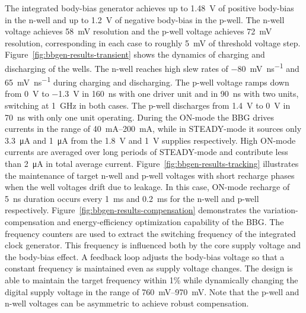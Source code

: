 \documentclass[graybox]{svmult}
\begin{document}
The integrated body-bias generator achieves up to \SI{1.48}{\volt} of positive body-bias in the n-well and up to \SI{1.2}{\volt} of negative body-bias in the p-well.
The n-well voltage achieves \SI{58}{\milli\volt} resolution and the p-well voltage achieves \SI{72}{\milli\volt} resolution, corresponding in each case to roughly \SI{5}{\milli\volt} of threshold voltage step.
Figure~\ref{fig:bbgen-results-transient} shows the dynamics of charging and discharging of the wells.
The n-well reaches high slew rates of \SI{-80}{\milli\volt\per\nano\second} and \SI[retain-explicit-plus]{+65}{\milli\volt\per\nano\second} during charging and discharging.
The p-well voltage ramps down from \SI{0}{\volt} to \SI{-1.3}{\volt} in \SI{160}{\nano\second} with one driver unit and in \SI{90}{\nano\second} with two units, switching at \SI{1}{\giga\hertz} in both cases.
The p-well discharges from \SI{1.4}{\volt} to \SI{0}{\volt} in \SI{70}{\nano\second} with only one unit operating.
During the ON-mode the BBG drives currents in the range of \SIrange[range-phrase = --]{40}{200}{\milli\ampere}, while in STEADY-mode it sources only \SI{3.3}{\micro\ampere} and \SI{1}{\micro\ampere} from the \SI{1.8}{\volt} and \SI{1}{\volt} supplies respectively.
High ON-mode currents are averaged over long periods of STEADY-mode and contribute less than \SI{2}{\micro\ampere} in total average current.
Figure~\ref{fig:bbgen-results-tracking} illustrates the maintenance of target n-well and p-well voltages with short recharge phases when the well voltages drift due to leakage.
In this case, ON-mode recharge of \SI{5}{\nano\second} duration occurs every \SI{1}{\milli\second} and \SI{0.2}{\milli\second} for the n-well and p-well respectively.
Figure~\ref{fig:bbgen-results-compensation} demonstrates the variation-compensation and energy-efficiency optimization capability of the BBG.
The frequency counters are used to extract the switching frequency of the integrated clock generator.
This frequency is influenced both by the core supply voltage and the body-bias effect.
A feedback loop adjusts the body-bias voltage so that a constant frequency is maintained even as supply voltage changes.
The design is able to maintain the target frequency within 1\% while dynamically changing the digital supply voltage in the range of \SIrange[range-phrase = --]{760}{970}{\milli\volt}.
Note that the p-well and n-well voltages can be asymmetric to achieve robust compensation.
\end{document}
